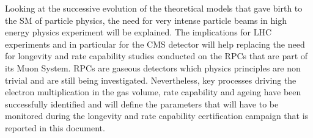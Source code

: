 Looking at the successive evolution of the theoretical models that gave birth to the \acf{SM} of particle physics, the need for very intense particle beams in high energy physics experiment will be explained. The implications for LHC experiments and in particular for the CMS detector will help replacing the need for longevity and rate capability studies conducted on the \acl{RPC}s that are part of its Muon System. RPCs are gaseous detectors which physics principles are non trivial and are still being investigated. Nevertheless, key processes driving the electron multiplication in the gas volume, rate capability and ageing have been successfully identified and will define the parameters that will have to be monitored during the longevity and rate capability certification campaign that is reported in this document.

\clearpage{\pagestyle{empty}\cleardoublepage}